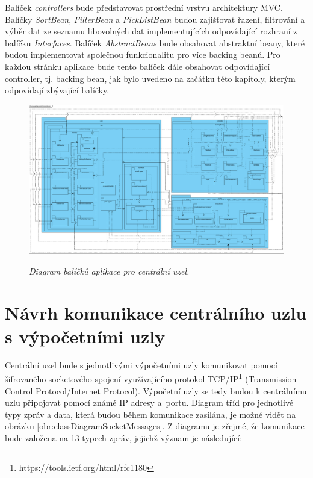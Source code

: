 Balíček \textit{controllers} bude představovat prostřední vrstvu architektury MVC. Balíčky \textit{SortBean}, \textit{FilterBean} a \textit{PickListBean} budou zajišťovat řazení, filtrování a výběr dat ze seznamu libovolných dat implementujících odpovídající rozhraní z balíčku \textit{Interfaces}. Balíček \textit{AbstractBeans} bude obsahovat abstraktní beany, které budou implementovat společnou funkcionalitu pro více backing beanů. Pro každou stránku aplikace bude tento balíček dále obsahovat odpovídající controller, tj. backing bean, jak bylo uvedeno na začátku této kapitoly, kterým odpovídají zbývající balíčky.

\eject \pdfpagewidth=420mm
\begin{figure}[H]
    \scalebox{0.5 }
    {
        \includegraphics{images/PackageDiagramPrimaryNode.pdf}
    }
    \caption{\label{obr:packageDiagramPrimaryNode} {\it Diagram balíčků aplikace pro centrální uzel.}}
\end{figure}

\eject \pdfpagewidth=210mm

\section{Návrh komunikace centrálního uzlu s výpočetními uzly}
\label{section:communicationDesign}

Centrální uzel bude s jednotlivými výpočetními uzly komunikovat pomocí šifrovaného socketového spojení využívajícího protokol TCP/IP\footnote{https://tools.ietf.org/html/rfc1180} (Transmission Control Protocol/Internet Protocol). Výpočetní uzly se tedy budou k centrálnímu uzlu připojovat pomocí známé IP adresy a~portu. Diagram tříd pro jednotlivé typy zpráv a data, která budou během komunikace zasílána, je možné vidět na obrázku \ref{obr:classDiagramSocketMessages}. Z diagramu je zřejmé, že komunikace bude založena na 13 typech zpráv, jejichž význam je následující:

